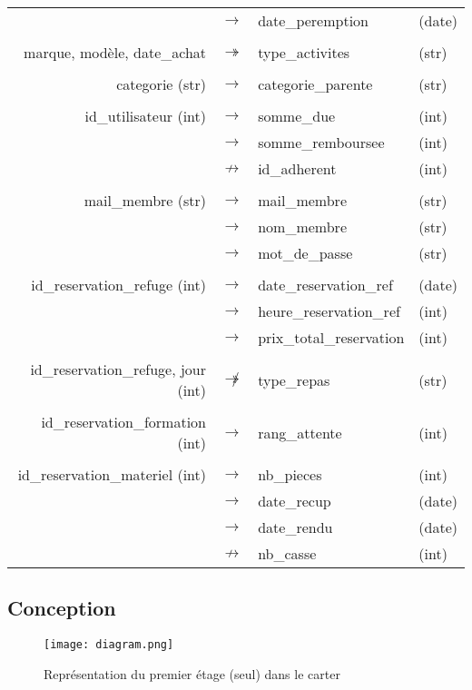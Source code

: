 \documentclass[a4paper, 10pt]{article} %
\begin{document}
\begin{tabular}{rlll}
               & $\rightarrow$ & date\_peremption & (date) \\
  \\
  marque, modèle, date\_achat & $\twoheadrightarrow$ & type\_activites & (str) \\
  \\
  categorie (str) & $\rightarrow$ & categorie\_parente & (str) \\
  \\
  id\_utilisateur (int) & $\rightarrow$ & somme\_due & (int) \\
                        & $\rightarrow$ & somme\_remboursee & (int) \\
                        & $\nrightarrow$ & id\_adherent & (int) \\
  \\
  mail\_membre (str) & $\rightarrow$ & mail\_membre & (str) \\ 
                        & $\rightarrow$ & nom\_membre & (str) \\
                        & $\rightarrow$ & mot\_de\_passe & (str) \\
\\
id\_reservation\_refuge (int) & $\rightarrow$ & date\_reservation\_ref & (date) \\
                        & $\rightarrow$ & heure\_reservation\_ref & (int) \\
                        & $\rightarrow$ & prix\_total\_reservation & (int) \\
\\
id\_reservation\_refuge, jour (int) & $\not\twoheadrightarrow$ & type\_repas & (str) \\
\\
id\_reservation\_formation (int) & $\rightarrow$ & rang\_attente & (int) \\
\\
id\_reservation\_materiel (int) & $\rightarrow$ & nb\_pieces & (int) \\
                                & $\rightarrow$ & date\_recup & (date) \\
                                & $\rightarrow$ & date\_rendu & (date) \\
                                & $\nrightarrow$ & nb\_casse & (int) \\

\end{tabular}

\begin{landscape} \pagestyle{empty}
\section{Conception}
    \begin{figure}[h!]
      \texttt{[image: diagram.png]}
      \caption{Représentation du premier étage (seul) dans le carter}
    \end{figure}
\end{landscape}
\end{document}
